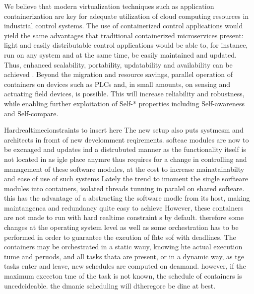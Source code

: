 \documentclass[]{scrartcl}
\begin{document}
We believe that modern virtualization techniques such as application containerization \cite{Mogaetal2016,Tascietal2018,GoldschmidtHauck-Stattelmann2016} are key for adequate utilization of cloud computing resources in industrial control systems.
The use of containerized control applications would yield the same advantages that traditional containerized microservices present: light and easily distributable control applications would be able to, for instance, run on any system and at the same time, be easily maintained and updated. 
Thus, enhanced scalability, portability, updatability and availability can be achieved \cite{Fazioetal2016}.
Beyond the migration and resource savings, parallel operation of containers on devices such as PLCs and, in small amounts, on sensing and actuating field devices, is possible. 
This will increase reliability and robustness, while enabling further exploitation of Self-* properties including Self-awareness and Self-compare.

Hardrealtimecionstraints to insert here
The new setup also puts systmesm and architects in fromt of new develomment reqirements. softeae modules are now to be excnaged and updates ind a distrubuted manner as the functionality itself is not located in as igle place anymre 
thus requires for a change in controlling and management of these software modules, at the cost to increase mainatainabilty and ease of use of such systems
Lately the trend to imoment the single sorfteare modules into containers, isolated threads tunning in paralel on shared softeare. this has the advantage of a abstracting the software modle from its host, making maintangenca and redundancy quite easy to achieve %
However, these containers are not made to run with hard realtime constraint s by default. therefore some changes at the operating system level as well as some orchestration has to be performed in order to guarantee the exeution of fhte sof with deadlines.
The containers may be orchestrated in a static wauy, knowing hte actual execution tume and peruods, and all tasks thata are present, or in a dynamic way, as tge tasks enter and leave, new schedules are computed on deamand.
however, if the maximum execcton tme of the task is not known, the schedule of containers is uncedcideable. the dmanic scheduling will dtheregore be dine at best.
\end{document}
